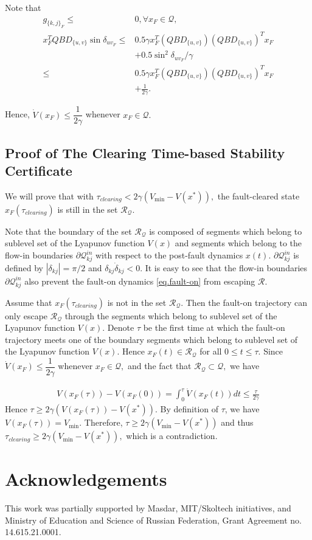 \documentclass[final]{IEEEtran}
\begin{document}
 Note that
\begin{align}
 g_{\{k,j\}_F} \le &0, \forall x_F \in \mathcal{Q}, \nonumber \\
 x_F^TQBD_{\{u,v\}}\sin\delta_{uv_F} \le & 0.5\gamma x_F^T(QBD_{\{u,v\}})(QBD_{\{u,v\}})^Tx_F \nonumber \\
 &+ 0.5\sin^2\delta_{uv_F}/\gamma \nonumber \\
                                     \le & 0.5\gamma x_F^T(QBD_{\{u,v\}})(QBD_{\{u,v\}})^Tx_F \nonumber \\&+ \frac{1}{2\gamma}.
\end{align}

Hence, $\dot{V}(x_F) \le \dfrac{1}{2\gamma}$ whenever $x_F \in
\mathcal{Q}.$


\subsection{Proof of The Clearing Time-based Stability Certificate}
\label{appendix.ClearingTimeCertificate} We will prove that with
$\tau_{clearing}<2\gamma (V_{\min}-V(x^*)),$ the fault-cleared state
$x_F(\tau_{clearing})$ is still in the set $\mathcal{R_Q}.$

Note that the boundary of the set $\mathcal{R_Q}$ is composed of
segments which belong to sublevel set of the Lyapunov function
$V(x)$ and segments which belong to the flow-in boundaries
$\partial\mathcal{Q}^{in}_{kj}$ with respect to the post-fault
dynamics $x(t).$ $\partial\mathcal{Q}^{in}_{kj}$ is defined by
$|\delta_{kj}|=\pi/2$ and $\delta_{kj}\dot{\delta}_{kj}<0.$ It is
easy to see that the flow-in boundaries
$\partial\mathcal{Q}^{in}_{kj}$ also prevent the fault-on dynamics
\eqref{eq.fault-on} from escaping $\mathcal{R}.$

Assume that $x_F(\tau_{clearing})$ is not in the set
$\mathcal{R_Q}.$ Then the fault-on trajectory can only escape
$\mathcal{R_Q}$ through the segments which belong to sublevel set
of the Lyapunov function $V(x).$ Denote $\tau$ be the first time
at which the fault-on trajectory meets one of the boundary
segments which belong to sublevel set of the Lyapunov function
$V(x).$ Hence $x_F(t) \in \mathcal{R_Q}$ for all $0 \le t \le
\tau.$ Since $\dot{V}(x_F) \le \dfrac{1}{2\gamma}$ whenever $x_F
\in \mathcal{Q},$ and the fact that $\mathcal{R_Q}\subset
\mathcal{Q},$ we have

\begin{align}
V(x_F(\tau))-V(x_F(0)) = \int_0^{\tau} \dot{V}(x_F(t))dt \le
\frac{\tau}{2\gamma}
\end{align}
Hence $\tau \ge 2\gamma (V(x_F(\tau))-V(x^*)).$ By definition of $\tau$, we
have $V(x_F(\tau))=V_{\min}.$ Therefore, $\tau \ge 2\gamma
(V_{\min}-V(x^*))$ and thus $\tau_{clearing}\ge 2\gamma (V_{\min}-V(x^*)),$ which is
a contradiction.

\section{Acknowledgements}
This work was partially supported by  Masdar, MIT/Skoltech
initiatives, and Ministry of Education and Science of Russian
Federation, Grant Agreement no. 14.615.21.0001.



\end{document}
